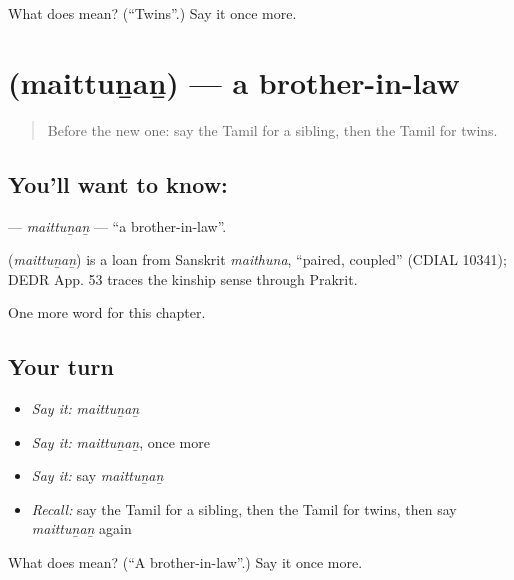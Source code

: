 \begin{tcolorbox}[breakable,colback=teal!4,colframe=teal!35!black,title={Before you move on}]
What does  mean? (\textquotedblleft{}Twins\textquotedblright{}.) Say it once more.
\end{tcolorbox}
\section[\texorpdfstring{\ta{மைத்துனன்} (maittuṉaṉ)}{மைத்துனன் (maittuṉaṉ)}]{ (maittuṉaṉ) — a brother-in-law}

\label{lesson:TA-C273-maittunan}



\begin{quote}
Before the new one: say the Tamil for a sibling, then the Tamil for twins.
\end{quote}

\subsection*{You'll want to know: }
\textbf{} — \emph{maittuṉaṉ} — \textquotedblleft{}a brother-in-law\textquotedblright{}.

\begin{cousinweb}
\textbf{} (\emph{maittuṉaṉ}) is a loan from Sanskrit \emph{maithuna}, \textquotedblleft{}paired, coupled\textquotedblright{} (CDIAL 10341); DEDR App. 53 traces the kinship sense through Prakrit.
\end{cousinweb}

\begin{grammarlens}[title={What you've built}]
One more word for this chapter.
\end{grammarlens}

\subsection*{Your turn}
\begin{itemize}
\raggedright
  \item \emph{Say it:} \emph{maittuṉaṉ}
  \item \emph{Say it:} \emph{maittuṉaṉ}, once more
  \item \emph{Say it:} say \emph{maittuṉaṉ}
  \item \emph{Recall:} say the Tamil for a sibling, then the Tamil for twins, then say \emph{maittuṉaṉ} again
\end{itemize}

\begin{tcolorbox}[breakable,colback=teal!4,colframe=teal!35!black,title={Before you move on}]
What does  mean? (\textquotedblleft{}A brother-in-law\textquotedblright{}.) Say it once more.
\end{tcolorbox}
